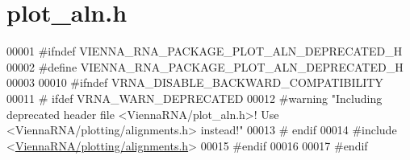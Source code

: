 \hypertarget{plot__aln_8h_source}{}\section{plot\+\_\+aln.\+h}
\label{plot__aln_8h_source}

\begin{DoxyCode}
00001 \textcolor{preprocessor}{#ifndef VIENNA\_RNA\_PACKAGE\_PLOT\_ALN\_DEPRECATED\_H}
00002 \textcolor{preprocessor}{#define VIENNA\_RNA\_PACKAGE\_PLOT\_ALN\_DEPRECATED\_H}
00003 
00010 \textcolor{preprocessor}{#ifndef VRNA\_DISABLE\_BACKWARD\_COMPATIBILITY}
00011 \textcolor{preprocessor}{# ifdef VRNA\_WARN\_DEPRECATED}
00012 \textcolor{preprocessor}{#warning "Including deprecated header file <ViennaRNA/plot\_aln.h>! Use <ViennaRNA/plotting/alignments.h>
       instead!"}
00013 \textcolor{preprocessor}{# endif}
00014 \textcolor{preprocessor}{#include <\hyperlink{plotting_2alignments_8h}{ViennaRNA/plotting/alignments.h}>}
00015 \textcolor{preprocessor}{#endif}
00016 
00017 \textcolor{preprocessor}{#endif}
\end{DoxyCode}
